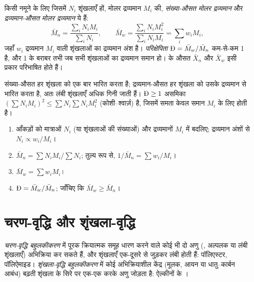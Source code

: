 \begin{definition}[मोलर-द्रव्यमान औसत]\label{def:b2:polymer-synthesis:averages}
किसी नमूने के लिए जिसमें $N_i$ शृंखलाएँ हों, मोलर द्रव्यमान $M_i$ की, \emph{संख्या-औसत मोलर
द्रव्यमान} और \emph{द्रव्यमान-औसत मोलर द्रव्यमान}
ये हैं:
\begin{equation*}
\bar M_n = \frac{\sum_i N_i M_i}{\sum_i N_i}, \qquad
\bar M_w = \frac{\sum_i N_i M_i^2}{\sum_i N_i M_i} = \sum_i w_i M_i,
\end{equation*}
जहाँ $w_i$ द्रव्यमान $M_i$ वाली शृंखलाओं का द्रव्यमान अंश है। \emph{परिक्षेपिता}
$\text{\DH} = \bar M_w/\bar M_n$ कम-से-कम 1 है, और 1 के बराबर तभी जब सभी शृंखलाओं का द्रव्यमान
समान हो।  के औसत $\bar X_n$ और $\bar X_w$ इसी प्रकार परिभाषित
होते हैं।
\end{definition}

संख्या-औसत हर शृंखला को एक बार भारित करता है; द्रव्यमान-औसत हर शृंखला को उसके द्रव्यमान से भारित करता है, अतः
लंबी शृंखलाएँ अधिक गिनी जाती हैं। $\text{\DH} \ge 1$ असमिका $\left(\sum N_i M_i\right)^2 \le
\sum N_i \sum N_i M_i^2$ (कोशी--श्वार्ज़) है, जिसमें समता केवल समान $M_i$ के लिए होती है।

\begin{method}\label{met:b2:polymer-synthesis:averages}
\begin{enumerate}
  \item आँकड़ों को मात्राओं $N_i$ (या शृंखलाओं की संख्याओं) और द्रव्यमानों $M_i$ में बदलिए; द्रव्यमान अंशों से
        $N_i \propto w_i/M_i$।
  \item $\bar M_n = \sum N_i M_i / \sum N_i$; तुल्य रूप से, $1/\bar M_n = \sum w_i/M_i$।
  \item $\bar M_w = \sum w_i M_i$।
  \item $\text{\DH} = \bar M_w/\bar M_n$; जाँचिए कि $\bar M_w \ge \bar M_n$।
\end{enumerate}
\end{method}

\section{चरण-वृद्धि और शृंखला-वृद्धि}

\begin{definition}[चरण-वृद्धि और शृंखला-वृद्धि]\label{def:b2:polymer-synthesis:step-chain}
\emph{चरण-वृद्धि बहुलकीकरण} में पूरक क्रियात्मक समूह धारण करने वाले कोई भी दो अणु
(, अल्पलक या लंबी शृंखलाएँ) अभिक्रिया कर सकते हैं, और शृंखलाएँ
एक-दूसरे से जुड़कर लंबी होती हैं: पॉलिएस्टर, पॉलिऐमाइड। \emph{शृंखला-वृद्धि
बहुलकीकरण} में कोई अभिक्रियाशील केंद्र (मूलक, आयन या धातु--कार्बन
आबंध) बढ़ती शृंखला के सिरे पर एक-एक करके  अणु जोड़ता है: ऐल्कीनों के ।
\end{definition}

